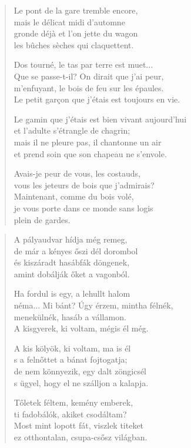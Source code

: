 \documentclass[11pt]{extbook}
\newcommand*{\centeredornament}{\centerline{\pgfornament[width=6cm]{88}}}
\begin{document}
\begin{verse}
  Le pont de la gare tremble encore, \\
  mais le délicat midi d'automne \\
  gronde déjà et l'on jette du wagon \\
  les bûches sèches qui claquettent.

  Dos tourné, le tas par terre est muet... \\
  Que se passe-t-il? On dirait que j'ai peur, \\
  m'enfuyant, le bois de feu sur les épaules. \\
  Le petit garçon que j'étais est toujours en vie.

  Le gamin que j'étais est bien vivant aujourd'hui \\
  et l'adulte s'étrangle de chagrin; \\
  mais il ne pleure pas, il chantonne un air \\
  et prend soin que son chapeau ne s'envole.

  Avais-je peur de vous, les costauds, \\
  vous les jeteurs de bois que j'admirais? \\
  Maintenant, comme du bois volé, \\
  je vous porte dans ce monde sans logis \\
  plein de gardes.
\end{verse}

\newpage

\vspace*{-15mm}
\centeredornament



\begin{verse}
  A pályaudvar hídja még remeg, \\
  de már a kényes őszi dél dorombol \\
  és kiszáradt hasábfák döngenek, \\
  amint dobálják őket a vagonból.

  Ha fordul is egy, a lehullt halom \\
  néma... Mi bánt? Úgy érzem, mintha félnék, \\
  menekülnék, hasáb a vállamon. \\
  A kisgyerek, ki voltam, mégis él még.

  A kis kölyök, ki voltam, ma is él \\
  s a felnőttet a bánat fojtogatja; \\
  de nem könnyezik, egy dalt zöngicsél \\
  s ügyel, hogy el ne szálljon a kalapja.

  Tőletek féltem, kemény emberek, \\
  ti fadobálók, akiket csodáltam? \\
  Most mint lopott fát, viszlek titeket \\
  ez otthontalan, csupa-csősz világban.
\end{verse}
\end{document}
